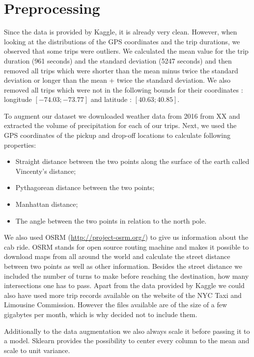 \documentclass[a4paper]{article}
\begin{document}
\section{Preprocessing}
Since the data is provided by Kaggle, it is already very clean. However, when
looking at the distributions of the GPS coordinates and the trip durations, we
observed that some trips were outliers. We calculated the mean value for the
trip duration (961 seconds) and the standard deviation (5247 seconds) and then
removed all trips which were shorter than the mean minus twice the standard
deviation or longer than the mean + twice the standard deviation. We also
removed all trips which were not in the following bounds for their coordinates :
longitude $[-74.03;-73.77]$ and latitude : $[40.63;40.85]$.

To augment our  dataset  we downloaded weather data from 2016 from XX and
extracted the volume of precipitation for each of our trips. Next, we used the
GPS coordinates of the pickup and drop-off locations to calculate following
properties:
\begin{itemize}
    \item Straight distance between the two points along the surface of the
earth called Vincenty’s distance;
    \item Pythagorean distance between the two points;
    \item Manhattan distance;
    \item The angle between the two points in relation to the north pole.
\end{itemize}
We also used OSRM (\url{http://project-osrm.org/}) to give us information
about the cab ride. OSRM stands for open source routing machine and makes it
possible to download maps from all around the world and calculate the street
distance between two points as well as other information. Besides the street
distance we included the number of turns to make before reaching the
destination, how many intersections one has to pass.  Apart from the data
provided by Kaggle we could also have used more trip records available on the
website of the NYC Taxi and Limousine Commission. However the files available
are of the size of a few gigabytes per month, which is why decided not to
include them.

Additionally to the data augmentation we also always scale it before passing it to a model. Sklearn provides the possibility to center every column to the mean and scale to unit variance.
\end{document}

